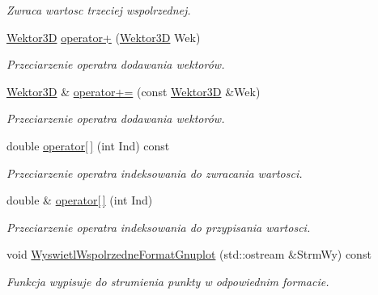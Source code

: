 \begin{DoxyCompactItemize}
\begin{DoxyCompactList}\small\item\em Zwraca wartosc trzeciej wspolrzednej. \end{DoxyCompactList}\item 
\hyperlink{class_wektor3_d}{Wektor3\+D} \hyperlink{class_wektor3_d_a93fed7ce6e4e0b1140732b08c76c8787}{operator+} (\hyperlink{class_wektor3_d}{Wektor3\+D} Wek)
\begin{DoxyCompactList}\small\item\em Przeciarzenie operatra dodawania wektorów. \end{DoxyCompactList}\item 
\hyperlink{class_wektor3_d}{Wektor3\+D} \& \hyperlink{class_wektor3_d_a34b7f09c43b7e59375fb4ff2c6f813df}{operator+=} (const \hyperlink{class_wektor3_d}{Wektor3\+D} \&Wek)
\begin{DoxyCompactList}\small\item\em Przeciarzenie operatra dodawania wektorów. \end{DoxyCompactList}\item 
\hypertarget{class_wektor3_d_a97bb602f6439757366e2893a52febe53}{double \hyperlink{class_wektor3_d_a97bb602f6439757366e2893a52febe53}{operator\mbox{[}$\,$\mbox{]}} (int Ind) const }\label{class_wektor3_d_a97bb602f6439757366e2893a52febe53}

\begin{DoxyCompactList}\small\item\em Przeciarzenie operatra indeksowania do zwracania wartosci. \end{DoxyCompactList}\item 
\hypertarget{class_wektor3_d_a7fac7c17faa511769571a83bd47c44db}{double \& \hyperlink{class_wektor3_d_a7fac7c17faa511769571a83bd47c44db}{operator\mbox{[}$\,$\mbox{]}} (int Ind)}\label{class_wektor3_d_a7fac7c17faa511769571a83bd47c44db}

\begin{DoxyCompactList}\small\item\em Przeciarzenie operatra indeksowania do przypisania wartosci. \end{DoxyCompactList}\item 
\hypertarget{class_wektor3_d_a95096d9a72b56c81182787df18fe9cdb}{void \hyperlink{class_wektor3_d_a95096d9a72b56c81182787df18fe9cdb}{Wyswietl\+Wspolrzedne\+Format\+Gnuplot} (std\+::ostream \&Strm\+Wy) const }\label{class_wektor3_d_a95096d9a72b56c81182787df18fe9cdb}

\begin{DoxyCompactList}\small\item\em Funkcja wypisuje do strumienia punkty w odpowiednim formacie. \end{DoxyCompactList}\end{DoxyCompactItemize}


